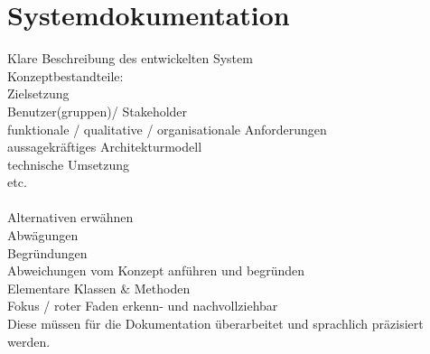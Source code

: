 
\chapter{Systemdokumentation}

Klare Beschreibung des entwickelten System\\
Konzeptbestandteile:\\
Zielsetzung\\
Benutzer(gruppen)/ Stakeholder\\
funktionale / qualitative / organisationale Anforderungen\\
aussagekräftiges Architekturmodell\\
technische Umsetzung\\
etc.\\
\\
Alternativen erwähnen\\
Abwägungen\\
Begründungen\\
Abweichungen vom Konzept anführen und begründen\\
Elementare Klassen \& Methoden\\
Fokus / roter Faden erkenn- und nachvollziehbar\\

Diese müssen für die Dokumentation überarbeitet und sprachlich präzisiert werden.


\newpage



\newpage



\newpage



\newpage





